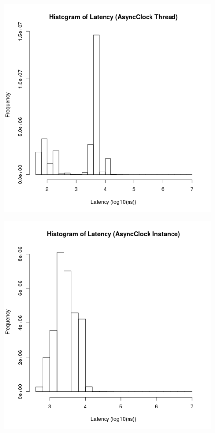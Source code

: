 \clearpage

\begin{figure}
\center
\includegraphics[height=.25\textheight]{async_thread_latency_hist.png}
\caption{\label{async_thread_latency}}
\end{figure}

\begin{figure}
\center
\includegraphics[height=.25\textheight]{async_instance_latency_hist.png}
\caption{\label{async_instance_latency}}
\end{figure}


